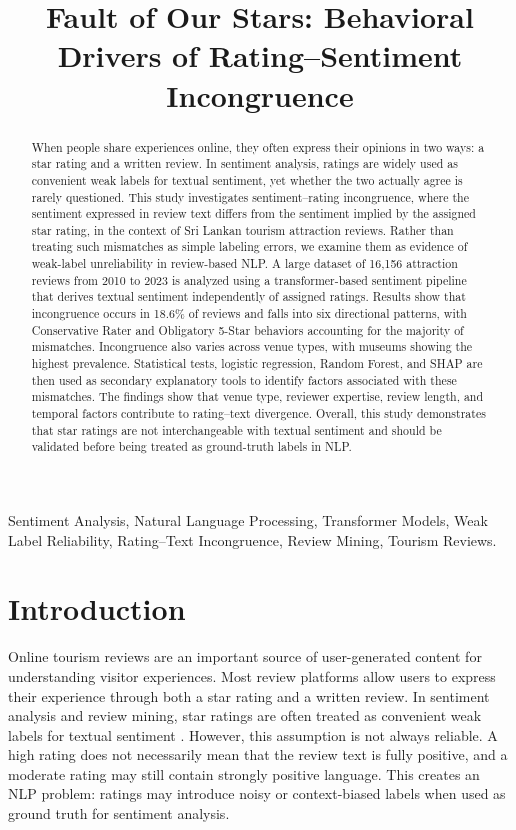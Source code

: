\documentclass[conference]{IEEEtran}
\begin{document}
\title{Fault of Our Stars: Behavioral Drivers of
Rating–Sentiment Incongruence}


\maketitle

\begin{abstract}
When people share experiences online, they often express their opinions in two ways: a star rating and a written review. In sentiment analysis, ratings are widely used as convenient weak labels for textual sentiment, yet whether the two actually agree is rarely questioned. This study investigates sentiment–rating incongruence, where the sentiment expressed in review text differs from the sentiment implied by the assigned star rating, in the context of Sri Lankan tourism attraction reviews. Rather than treating such mismatches as simple labeling errors, we examine them as evidence of weak-label unreliability in review-based NLP. A large dataset of 16,156 attraction reviews from 2010 to 2023 is analyzed using a transformer-based sentiment pipeline that derives textual sentiment independently of assigned ratings. Results show that incongruence occurs in 18.6\% of reviews and falls into six directional patterns, with Conservative Rater and Obligatory 5-Star behaviors accounting for the majority of mismatches. Incongruence also varies across venue types, with museums showing the highest prevalence. Statistical tests, logistic regression, Random Forest, and SHAP are then used as secondary explanatory tools to identify factors associated with these mismatches. The findings show that venue type, reviewer expertise, review length, and temporal factors contribute to rating–text divergence. Overall, this study demonstrates that star ratings are not interchangeable with textual sentiment and should be validated before being treated as ground-truth labels in NLP.
\end{abstract}

\begin{IEEEkeywords}
Sentiment Analysis, Natural Language Processing, Transformer Models, Weak Label Reliability, Rating–Text Incongruence, Review Mining, Tourism Reviews.
\end{IEEEkeywords}

\section{Introduction}
Online tourism reviews are an important source of user-generated content for understanding visitor experiences. Most review platforms allow users to express their experience through both a star rating and a written review. In sentiment analysis and review mining, star ratings are often treated as convenient weak labels for textual sentiment \cite{Pang,alaei}. However, this assumption is not always reliable. A high rating does not necessarily mean that the review text is fully positive, and a moderate rating may still contain strongly positive language. This creates an NLP problem: ratings may introduce noisy or context-biased labels when used as ground truth for sentiment analysis.
\end{document}
